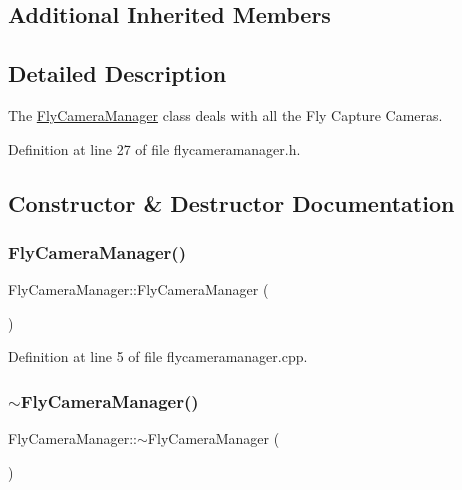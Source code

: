 \subsection*{Additional Inherited Members}


\subsection{Detailed Description}
The \mbox{\hyperlink{class_fly_camera_manager}{Fly\+Camera\+Manager}} class deals with all the Fly Capture Cameras. 

Definition at line 27 of file flycameramanager.\+h.



\subsection{Constructor \& Destructor Documentation}
\mbox{\label{class_fly_camera_manager_aae844953f01b9ee53219968e280cd8d9}} 
\subsubsection{\texorpdfstring{FlyCameraManager()}{FlyCameraManager()}}
{\footnotesize\ttfamily Fly\+Camera\+Manager\+::\+Fly\+Camera\+Manager (\begin{DoxyParamCaption}{ }\end{DoxyParamCaption})}



Definition at line 5 of file flycameramanager.\+cpp.

\mbox{\label{class_fly_camera_manager_a302cd47f5244d8fbcd2f1cdde52b92f6}} 
\subsubsection{\texorpdfstring{$\sim$FlyCameraManager()}{~FlyCameraManager()}}
{\footnotesize\ttfamily Fly\+Camera\+Manager\+::$\sim$\+Fly\+Camera\+Manager (\begin{DoxyParamCaption}{ }\end{DoxyParamCaption})}



